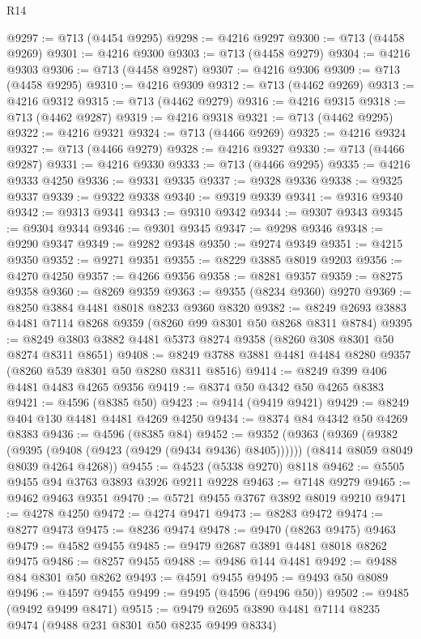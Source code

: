 \begin{lexlean}{R14}
\begin{coremodule}
@9297 := @713 (@4454 @9295)
@9298 := @4216 @9297
@9300 := @713 (@4458 @9269)
@9301 := @4216 @9300
@9303 := @713 (@4458 @9279)
@9304 := @4216 @9303
@9306 := @713 (@4458 @9287)
@9307 := @4216 @9306
@9309 := @713 (@4458 @9295)
@9310 := @4216 @9309
@9312 := @713 (@4462 @9269)
@9313 := @4216 @9312
@9315 := @713 (@4462 @9279)
@9316 := @4216 @9315
@9318 := @713 (@4462 @9287)
@9319 := @4216 @9318
@9321 := @713 (@4462 @9295)
@9322 := @4216 @9321
@9324 := @713 (@4466 @9269)
@9325 := @4216 @9324
@9327 := @713 (@4466 @9279)
@9328 := @4216 @9327
@9330 := @713 (@4466 @9287)
@9331 := @4216 @9330
@9333 := @713 (@4466 @9295)
@9335 := @4216 @9333 @4250
@9336 := @9331 @9335
@9337 := @9328 @9336
@9338 := @9325 @9337
@9339 := @9322 @9338
@9340 := @9319 @9339
@9341 := @9316 @9340
@9342 := @9313 @9341
@9343 := @9310 @9342
@9344 := @9307 @9343
@9345 := @9304 @9344
@9346 := @9301 @9345
@9347 := @9298 @9346
@9348 := @9290 @9347
@9349 := @9282 @9348
@9350 := @9274 @9349
@9351 := @4215 @9350
@9352 := @9271 @9351
@9355 := @8229 @3885 @8019 @9203
@9356 := @4270 @4250
@9357 := @4266 @9356
@9358 := @8281 @9357
@9359 := @8275 @9358
@9360 := @8269 @9359
@9363 := @9355 (@8234 @9360) @9270
@9369 := @8250 @3884 @4481 @8018 @8233 @9360 @8320
@9382 := @8249 @2693 @3883 @4481 @7114 @8268 @9359 (@8260 @99 @8301 @50 @8268 @8311 @8784)
@9395 := @8249 @3803 @3882 @4481 @5373 @8274 @9358 (@8260 @308 @8301 @50 @8274 @8311 @8651)
@9408 := @8249 @3788 @3881 @4481 @4484 @8280 @9357 (@8260 @539 @8301 @50 @8280 @8311 @8516)
@9414 := @8249 @399 @406 @4481 @4483 @4265 @9356
@9419 := @8374 @50 @4342 @50 @4265 @8383
@9421 := @4596 (@8385 @50)
@9423 := @9414 (@9419 @9421)
@9429 := @8249 @404 @130 @4481 @4481 @4269 @4250
@9434 := @8374 @84 @4342 @50 @4269 @8383
@9436 := @4596 (@8385 @84)
@9452 := @9352
    (@9363
      (@9369 (@9382 (@9395 (@9408 (@9423 (@9429 (@9434 @9436) @8405))))))
      (@8414 @8059 @8049 @8039 @4264 @4268))
@9455 := @4523 (@5338 @9270) @8118
@9462 := @5505 @9455 @94 @3763 @3893 @3926 @9211 @9228
@9463 := @7148 @9279
@9465 := @9462 @9463 @9351
@9470 := @5721 @9455 @3767 @3892 @8019 @9210
@9471 := @4278 @4250
@9472 := @4274 @9471
@9473 := @8283 @9472
@9474 := @8277 @9473
@9475 := @8236 @9474
@9478 := @9470 (@8263 @9475) @9463
@9479 := @4582 @9455
@9485 := @9479 @2687 @3891 @4481 @8018 @8262 @9475
@9486 := @8257 @9455
@9488 := @9486 @144 @4481
@9492 := @9488 @84 @8301 @50 @8262
@9493 := @4591 @9455
@9495 := @9493 @50 @8089
@9496 := @4597 @9455
@9499 := @9495 (@4596 (@9496 @50))
@9502 := @9485 (@9492 @9499 @8471)
@9515 := @9479 @2695 @3890 @4481 @7114 @8235 @9474 (@9488 @231 @8301 @50 @8235 @9499 @8334)

\end{coremodule}
\end{lexlean}
